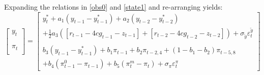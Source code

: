 \documentclass[a4paper,12pt]{article}
\begin{document}
\pagebreak

Expanding the relations in \ref{obs0} and \ref{state1} and re-arranging
yields:%
\begin{equation}
\begin{bmatrix}
y_{t} \\
\\
\\
\pi _{t} \\
\end{bmatrix}%
=%
\begin{bmatrix}
y_{t}^{\ast }+a_{1}\left( y_{t-1}-y_{t-1}^{\ast }\right) +a_{2}\left(
y_{t-2}-y_{t-2}^{\ast }\right) \\
+\frac{1}{2}a_{3}\left( \left[ r_{t-1}-4cg_{t-1}-z_{t-1}\right] +\left[
r_{t-2}-4cg_{t-2}-z_{t-2}\right] \right) +\sigma _{\tilde{y}}\varepsilon
_{t}^{\tilde{y}} \\
\\
b_{3}\left( y_{t-1}-y_{t-1}^{\ast }\right) +b_{1}\pi _{t-1}+b_{2}\pi
_{t-2,4}+\left( 1-b_{1}-b_{2}\right) \pi _{t-5,8} \\
+b_{4}\left( \pi _{t-1}^{0}-\pi _{t-1}\right) +b_{5}\left( \pi _{t}^{m}-\pi
_{t}\right) +\sigma _{\pi }\varepsilon _{t}^{\pi }%
\end{bmatrix}
\label{lwa}
\end{equation}
\end{document}
